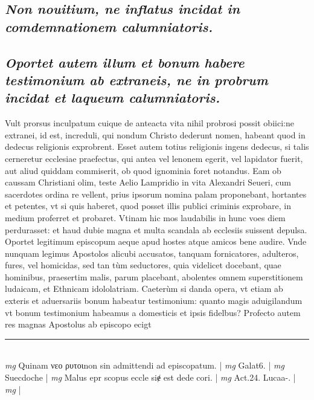 \documentclass{article}
\begin{document}
\begin{pages}
\subsection*{\textit{Non nouitium, ne inflatus incidat in comdemnationem calumniatoris. }}
{}
\subsection*{\textit{Oportet autem illum et bonum habere testimonium ab extraneis, ne in probrum incidat et laqueum calumniatoris. }}\pstart Vult prorsus inculpatum cuique de anteacta vita nihil probrosi possit obiici:ne extranei, id est, increduli, qui nondum Christo dederunt nomen, habeant quod in dedecus religionis exprobrent. Esset autem totius religionis ingens dedecus, si talis cerneretur ecclesiae praefectus, qui antea vel lenonem egerit, vel lapidator fuerit, aut aliud quiddam commiserit, ob quod ignominia foret notandus. Eam ob caussam Christiani olim, teste Aelio Lampridio in vita Alexandri Seueri, cum sacerdotes ordina re vellent, prius ipsorum nomina palam proponebant, hortantes et petentes, vt si quis haberet, quod posset illis publici criminis exprobare, in medium proferret et probaret. Vtinam hic mos laudabilis in hunc voes diem perdurasset: et haud dubie magna et multa scandala ab ecclesiis suissent depulsa. Oportet legitimum episcopum aeque apud hostes atque amicos bene audire. Vnde nunquam legimus Apostolos alicubi accusatos, tanquam fornicatores, adulteros, fures, vel homicidas, sed tan tùm seductores, quia videlicet docebant, quae hominibus, praesertim malis, parum placebant, abolentes omnem superstitionem ludaicam, et Ethnicam idololatriam. Caeterùm si danda opera, vt etiam ab exteris et aduersariis bonum habeatur testimonium: quanto magis aduigilandum vt bonum testimonium habeamus a domesticis et ipsis fidelbus? Profecto autem res magnas Apostolus ab episcopo ecigt  \pend
\vspace{0.5cm}\noindent
\vspace{0.2cm}\rule{1cm}{0.2pt}\\ 
\hspace{0.2cm}\textit{mg}
\footnotesize Quinam νεο ρυτοιnon sin admittendi ad episcopatum. 
\normalsize| 
\hspace{0.2cm}\textit{mg}
\footnotesize Galat6. 
\normalsize| 
\hspace{0.2cm}\textit{mg}
\footnotesize Suecdoche 
\normalsize| 
\hspace{0.2cm}\textit{mg}
\footnotesize Malus epr scopus eccle siɇ est dede cori. 
\normalsize| 
\hspace{0.2cm}\textit{mg}
\footnotesize Act.24. Lucaa-. 
\normalsize| 
\hspace{0.2cm}\textit{mg}
\footnotesize 
\normalsize| 

\end{pages}
\end{document}
